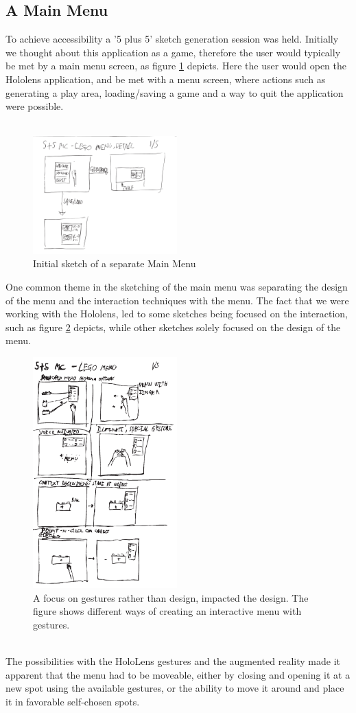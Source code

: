 \subsection{A Main Menu}
To achieve accessibility a '5 plus 5' sketch generation session was held. Initially we thought about this application as a game, therefore the user would typically be met by a main menu screen, as figure \ref{fig:menu8} depicts. Here the user would open the Hololens application, and be met with a menu screen, where actions such as generating a play area, loading/saving a game and a way to quit the application were possible. \\\\
\begin{figure}[t]
	\centering
	\includegraphics[width=210px]{figures/Menu/menu8_1.pdf}
	\caption{Initial sketch of a separate Main Menu}
	\label{fig:menu8}
\end{figure}
One common theme in the sketching of the main menu was separating the design of the menu and the interaction techniques with the menu. The fact that we were working with the Hololens, led to some sketches being focused on the interaction, such as figure \ref{fig:menugesture} depicts,  while other sketches solely focused on the design of the menu.\\
\begin{figure}[t]
	\centering
	\includegraphics[width=210px]{figures/Menu/menu5_1.pdf}
	\caption{A focus on gestures rather than design, impacted the design. The figure shows different ways of creating an interactive menu with gestures.}
	\label{fig:menugesture}
\end{figure}
\\
The possibilities with the HoloLens gestures and the augmented reality made it apparent that the menu had to be moveable, either by closing and opening it at a new spot using the available gestures, or the ability to move it around and place it in favorable self-chosen spots.
